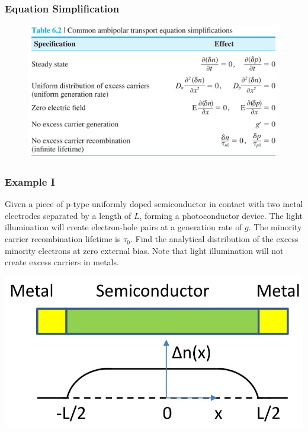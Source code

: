 \documentclass{beamer}
\begin{document}
    \begin{frame} \frametitle{Equation Simplification}
        \begin{figure}[H]
            \centering
            \includegraphics[width=0.9\linewidth]{Equation-simplification.jpg}
            \label{fig:Equation-simplification.jpg}
        \end{figure}
    \end{frame}


    \begin{frame} \frametitle{Example I}
        \par Given a piece of p-type uniformly doped semiconductor in contact with two metal electrodes separated by a length of $L$, forming a photoconductor device. The light illumination will create electron-hole pairs at a generation rate of $g$. The minority carrier recombination lifetime is $\tau_0$. Find the analytical distribution of the excess minority electrons at zero external bias. Note that light illumination will not create excess carriers in metals. \\[3em]
        \begin{minipage}{\linewidth}
            \begin{minipage}{0.3\linewidth}
                \includegraphics[width=\linewidth]{Example-1.jpg}
            \end{minipage}
            \begin{minipage}{0.69\linewidth}
            \end{minipage}
        \end{minipage}
    \end{frame}
\end{document}
